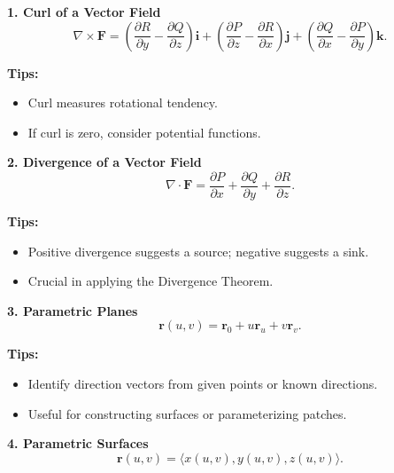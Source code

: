 \documentclass[9pt]{article}
\begin{document}
\begin{multicols}{2}
\footnotesize

\begin{tcolorbox}[title=, colframe=brightblue]
\textbf{1. Curl of a Vector Field}\\
\[
\nabla \times \mathbf{F}=\left(\frac{\partial R}{\partial y}-\frac{\partial Q}{\partial z}\right)\mathbf{i}+\left(\frac{\partial P}{\partial z}-\frac{\partial R}{\partial x}\right)\mathbf{j}+\left(\frac{\partial Q}{\partial x}-\frac{\partial P}{\partial y}\right)\mathbf{k}.
\]

\textbf{Tips:}
\begin{itemize}
    \item Curl measures rotational tendency. 
    \item If curl is zero, consider potential functions.
\end{itemize}
\end{tcolorbox}

\begin{tcolorbox}[title=, colframe=brightgreen]
\textbf{2. Divergence of a Vector Field}\\
\[
\nabla \cdot \mathbf{F}= \frac{\partial P}{\partial x}+\frac{\partial Q}{\partial y}+\frac{\partial R}{\partial z}.
\]

\textbf{Tips:}
\begin{itemize}
    \item Positive divergence suggests a source; negative suggests a sink.
    \item Crucial in applying the Divergence Theorem.
\end{itemize}
\end{tcolorbox}

\begin{tcolorbox}[title=, colframe=brightpink]
\textbf{3. Parametric Planes}\\
\[
\mathbf{r}(u,v)=\mathbf{r}_0 + u\mathbf{r}_u + v\mathbf{r}_v.
\]

\textbf{Tips:}
\begin{itemize}
    \item Identify direction vectors from given points or known directions.
    \item Useful for constructing surfaces or parameterizing patches.
\end{itemize}
\end{tcolorbox}

\begin{tcolorbox}[title=, colframe=brightyellow]
\textbf{4. Parametric Surfaces}\\
\[
\mathbf{r}(u,v)=\langle x(u,v),y(u,v),z(u,v)\rangle.
\]


\end{tcolorbox}
\end{multicols}
\end{document}
